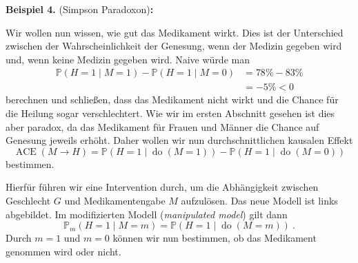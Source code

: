 \documentclass[headsepline,11pt,bibliography=leveldown]{scrbook}
\newcounter{NewZaehler}
\newcommand{\NewZahl}{\refstepcounter{NewZaehler}4.\theNewZaehler}
\newenvironment{NewBeispiel}[1]{\par\medskip\textbf{Beispiel \NewZahl} #1\textbf{:}\\}{\par\medskip}
\newcommand{\en}[1]{{\scriptsize(\textit{#1})}}
\newcommand{\Do}{\operatorname{do}}
\newcommand{\ACE}{\operatorname{ACE}}
\begin{document}
\begin{NewBeispiel}{(Simpson Paradoxon)\cite[S. 1ff, S. 55 - 58]{Primer}}
\begin{minipage}{0.5\linewidth}
\begin{center}
\end{center}
\end{minipage}

Wir wollen nun wissen, wie gut das Medikament wirkt. Dies ist der Unterschied zwischen der Wahrscheinlichkeit der Genesung, wenn der Medizin gegeben wird und, wenn keine Medizin gegeben wird. Naive würde man
\begin{align*}
\mathbb{P}(H = 1 \mid M = 1) - \mathbb{P}(H = 1 \mid M = 0) &= 78 \% - 83 \%\\
&= - 5 \% < 0
\end{align*}
berechnen und schließen, dass das Medikament nicht wirkt und die Chance für die Heilung sogar verschlechtert. Wie wir im ersten Abschnitt gesehen ist dies aber paradox, da das Medikament für Frauen und Männer die Chance auf Genesung jeweils erhöht. Daher wollen wir nun durchschnittlichen kausalen Effekt
\[\ACE(M \rightarrow H) = \mathbb{P}(H = 1 \mid \Do(M = 1)) - \mathbb{P}(H = 1 \mid \Do(M = 0))\]
bestimmen.\\

\begin{minipage}{0.5\linewidth}
\begin{center}
\end{center}
\end{minipage}
\begin{minipage}{0.5\linewidth}
Hierfür führen wir eine Intervention durch, um die Abhängigkeit zwischen Geschlecht $G$ und Medikamentengabe $M$ aufzulösen. Das neue Modell ist links abgebildet. Im modifizierten Modell \en{manipulated model} gilt dann
\[\mathbb{P}_m(H = 1 \mid M = m) = \mathbb{P}(H = 1 \mid \Do(M = m))~.\]
Durch $m = 1$ und $m = 0$ können wir nun bestimmen, ob das Medikament genommen wird oder nicht.\\
\end{minipage}


\end{NewBeispiel}
\end{document}
